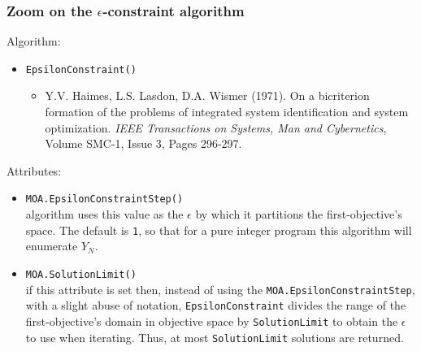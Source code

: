 \documentclass[]{beamer}
\newcommand*{\blue}[1]{\textcolor{nblue}{#1}}
\begin{document}
% 
%

\begin{frame}
  \frametitle{Zoom on the $\epsilon$-constraint algorithm}
  \medskip

Algorithm:
\begin{itemize}
\item    \blue{\texttt{EpsilonConstraint()}}

\smallskip
\begin{itemize}
\item  []
   {\tiny 
  Y.V. Haimes, L.S. Lasdon, D.A. Wismer (1971). On a bicriterion formation of the problems of integrated system identification and system optimization. \textit{IEEE Transactions on Systems, Man and Cybernetics}, Volume SMC-1, Issue 3, Pages 296-297.\\
  }
 \end{itemize}   
\vspace{-1mm}

\end{itemize}   
   

  \bigskip

Attributes:

\begin{itemize}
\item  \blue{\texttt{MOA.EpsilonConstraintStep()}} \\
\smallskip
{\scriptsize 
algorithm uses this value
   as the $\epsilon$ by which it partitions the first-objective's space. The
   default is \texttt{1}, so that for a pure integer program this algorithm will
   enumerate $Y_N$.\\
   }
   \medskip

\item \blue{\texttt{MOA.SolutionLimit()}} \\
\smallskip
{\scriptsize 
if this attribute is set then, instead of using the
   \texttt{MOA.EpsilonConstraintStep}, with a slight abuse of notation,
    \texttt{EpsilonConstraint} divides the range of the first-objective's domain in
   objective space by  \texttt{SolutionLimit} to obtain the  $\epsilon$  to use when
   iterating. Thus, at most  \texttt{SolutionLimit} solutions are returned.\\
   }
\end{itemize}   
\vfill
   
   \end{frame}
\end{document}
